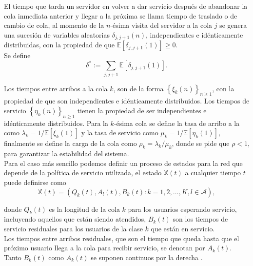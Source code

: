 \documentclass{article}
\newcommand{\esp}{\mathbb{E}}
\begin{document}
El tiempo que tarda un servidor en volver a dar servicio despu\'es de abandonar la cola inmediata anterior y llegar a la pr\'oxima se llama tiempo de traslado o de cambio  de cola, al momento de la $n$-\'esima visita del servidor a la cola $j$ se genera una sucesi\'on de variables aleatorias $\delta_{j,j+1}\left(n\right)$, independientes e id\'enticamente distribuidas, con la propiedad de que $\esp\left[\delta_{j,j+1}\left(1\right)\right]\geq0$.\\


Se define
\begin{equation}
\delta^{*}:=\sum_{j,j+1}\esp\left[\delta_{j,j+1}\left(1\right)\right].
\end{equation}

Los tiempos entre arribos a la cola $k$, son de la forma $\left\{\xi_{k}\left(n\right)\right\}_{n\geq1}$, con la propiedad de que son independientes e id\'enticamente distribuidos. Los tiempos de servicio $\left\{\eta_{k}\left(n\right)\right\}_{n\geq1}$ tienen la propiedad de ser independientes e id\'enticamente distribuidos. Para la $k$-\'esima cola se define la tasa de arribo a la como $\lambda_{k}=1/\esp\left[\xi_{k}\left(1\right)\right]$ y la tasa de servicio como $\mu_{k}=1/\esp\left[\eta_{k}\left(1\right)\right]$, finalmente se define la carga de la cola como $\rho_{k}=\lambda_{k}/\mu_{k}$, donde se pide que $\rho<1$, para garantizar la estabilidad del sistema.\\

Para el caso m\'as sencillo podemos definir un proceso de estados para la red que depende de la pol\'itica de servicio utilizada, el estado $\mathbb{X}\left(t\right)$ a cualquier tiempo $t$ puede definirse como
\begin{equation}\label{Eq.Esp.Estados}
\mathbb{X}\left(t\right)=\left(Q_{k}\left(t\right),A_{l}\left(t\right),B_{k}\left(t\right):k=1,2,\ldots,K,l\in\mathcal{A}\right),
\end{equation}

donde $Q_{k}\left(t\right)$ es la longitud de la cola $k$ para los usuarios esperando servicio, incluyendo aquellos que est\'an siendo atendidos, $B_{k}\left(t\right)$ son los tiempos de servicio residuales para los usuarios de la clase $k$ que est\'an en servicio.\\

Los tiempos entre arribos residuales, que son el tiempo que queda hasta que el pr\'oximo usuario llega a la cola para recibir servicio, se denotan por $A_{k}\left(t\right)$. Tanto $B_{k}\left(t\right)$ como $A_{k}\left(t\right)$ se suponen continuos por la derecha \cite{Dai2}.\\
\end{document}
